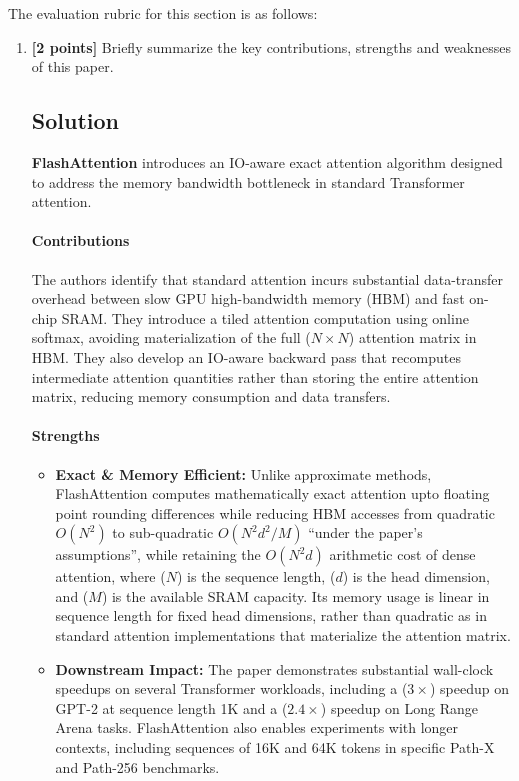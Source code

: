 \documentclass[11pt,english]{article}
\begin{document}
The evaluation rubric for this section is as follows:
\begin{enumerate}[resume]
\item
\textbf{[2 points]}
Briefly summarize the key contributions, strengths and weaknesses of this paper.

\subsection*{Solution}

\textbf{FlashAttention} introduces an IO-aware exact attention algorithm designed to address the memory bandwidth bottleneck in standard Transformer attention. 

\paragraph{Contributions} 
The authors identify that standard attention incurs substantial data-transfer overhead between slow GPU high-bandwidth memory (HBM) and fast on-chip SRAM. They introduce a tiled attention computation using online softmax, avoiding materialization of the full ($N \times N$) attention matrix in HBM. They also develop an IO-aware backward pass that recomputes intermediate attention quantities rather than storing the entire attention matrix, reducing memory consumption and data transfers.

\paragraph{Strengths}
\begin{itemize}[noitemsep,topsep=0pt]
    \item \textbf{Exact \& Memory Efficient:} Unlike approximate methods, FlashAttention computes mathematically exact attention upto floating point rounding differences while reducing HBM accesses from quadratic $O(N^2)$ to sub-quadratic $O(N^2 d^2 / M)$ ``under the paper's assumptions'', while retaining the $O(N^2d)$ arithmetic cost of dense attention, where ($N$) is the sequence length, ($d$) is the head dimension, and ($M$) is the available SRAM capacity. Its memory usage is linear in sequence length for fixed head dimensions, rather than quadratic as in standard attention implementations that materialize the attention matrix.
    \item \textbf{Downstream Impact:} The paper demonstrates substantial wall-clock speedups on several Transformer workloads, including a ($3\times$) speedup on GPT-2 at sequence length 1K and a ($2.4\times$) speedup on Long Range Arena tasks. FlashAttention also enables experiments with longer contexts, including sequences of 16K and 64K tokens in specific Path-X and Path-256 benchmarks.
\end{itemize}


\end{enumerate}
\end{document}
